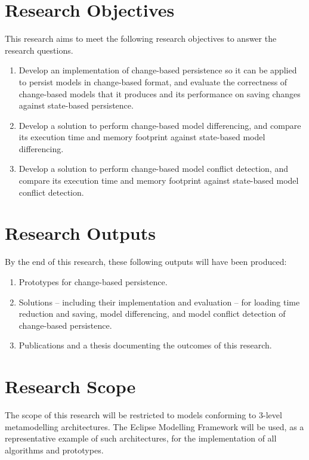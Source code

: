 \section{Research Objectives}
\label{sec:research_objectives}
This research aims to meet the following research objectives to answer the research questions.
\begin{enumerate}
\item Develop an implementation of change-based persistence so it can be applied to persist models in change-based format, and evaluate the correctness of change-based models that it produces and its performance on saving changes against state-based persistence. 
\item Develop a solution to perform change-based model differencing, and compare its execution time and memory footprint against state-based model differencing.
\item Develop a solution to perform change-based model conflict detection, and compare its execution time and memory footprint against state-based model conflict detection.
\end{enumerate}

\section{Research Outputs}
\label{sec:research_outputs}
By the end of this research, these following outputs will have been produced:
\begin{enumerate}
\item Prototypes for change-based persistence. 
\item Solutions -- including their implementation and evaluation -- for loading time reduction and saving, model differencing, and model conflict detection of change-based persistence.
\item Publications and a thesis documenting the outcomes of this research.
\end{enumerate}

\section{Research Scope}
\label{sec:research_scope}
The scope of this research will be restricted to models conforming to 3-level metamodelling architectures. The Eclipse Modelling Framework will be used, as a representative example of such architectures, for the implementation of all algorithms and prototypes.

